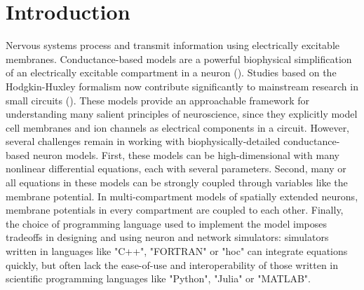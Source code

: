 \documentclass{frontiersSCNS} %
\begin{document}
\section{Introduction}
\label{sec:intro}

Nervous systems process and transmit information using electrically excitable membranes. Conductance-based models are a powerful biophysical simplification of an electrically excitable compartment in a neuron (\cite{hodgkinQuantitativeDescriptionMembrane1952a}). Studies based on the Hodgkin-Huxley formalism now contribute significantly to mainstream research in small circuits (\cite{marderTheoryMotion1995, prinzComputationalApproachesNeuronal2010, prinzInsightsModelsRhythmic2006}). These models provide an approachable framework for understanding many salient principles of neuroscience, since they explicitly model cell membranes and ion channels as electrical components in a circuit. However, several challenges remain in working with biophysically-detailed conductance-based neuron models. First, these models can be high-dimensional with many nonlinear differential equations, each with several parameters. Second, many or all equations in these models can be strongly coupled through variables like the membrane potential.  In multi-compartment models of spatially extended neurons, membrane potentials in every compartment are coupled to each other. Finally, the choice of programming language used to implement the model imposes tradeoffs in designing and using neuron and network simulators: simulators written in languages like "C++", "FORTRAN" or "hoc" can integrate equations quickly, but often lack the ease-of-use and interoperability of those written in scientific programming languages like "Python", "Julia" or "MATLAB". 
\end{document}
